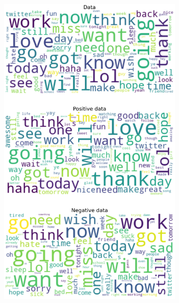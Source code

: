 \documentclass{article}
\begin{document}
\begin{itemize}
\begin{figure}[H]
\begin{subfigure}[b]{0.24\textwidth}
\includegraphics[width=\textwidth]{chapter-06/section-01-01/13/visualization/2/wordcloud.png}
\end{subfigure}
\begin{subfigure}[b]{0.24\textwidth}
\centering

\end{subfigure}
\end{figure}
\end{itemize}
\end{document}
